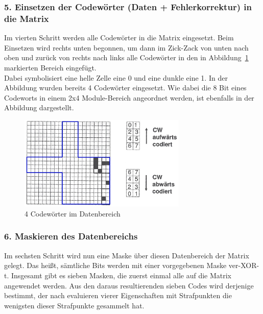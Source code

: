 \subsubsection*{5. Einsetzen der Codewörter (Daten + Fehlerkorrektur) in die Matrix}
Im vierten Schritt werden alle Codewörter in die Matrix eingesetzt. Beim Einsetzen wird rechts unten begonnen, um dann im Zick-Zack von unten nach oben und zurück von rechts nach links alle Codewörter in den in Abbildung~\ref{fig:insertcw} markierten Bereich eingefügt.\\
Dabei symbolisiert eine helle Zelle eine 0 und eine dunkle eine 1. In der Abbildung wurden bereits 4 Codewörter eingesetzt. Wie dabei die 8 Bit eines Codeworts in einem 2x4 Module-Bereich angeordnet werden, ist ebenfalls in der Abbildung dargestellt.
\begin{figure}[htbp]
	\centering
	\includegraphics[width=8cm]{Bilder/QR_CW_einsetzen.png}
	\caption[4 Codewörter im Datenbereich]{4 Codewörter im Datenbereich\footnotemark}
	\label{fig:insertcw}
	\hfill
\end{figure}

\subsubsection*{6. Maskieren des Datenbereichs}
Im sechsten Schritt wird nun eine Maske über diesen Datenbereich der Matrix gelegt. Das heißt, sämtliche Bits werden mit einer vorgegebenen Maske ver-XOR-t. Insgesamt gibt es sieben Masken, die zuerst einmal alle auf die Matrix angewendet werden. Aus den daraus resultierenden sieben Codes wird derjenige bestimmt, der nach evaluieren vierer Eigenschaften mit Strafpunkten die wenigsten dieser Strafpunkte gesammelt hat. \\

